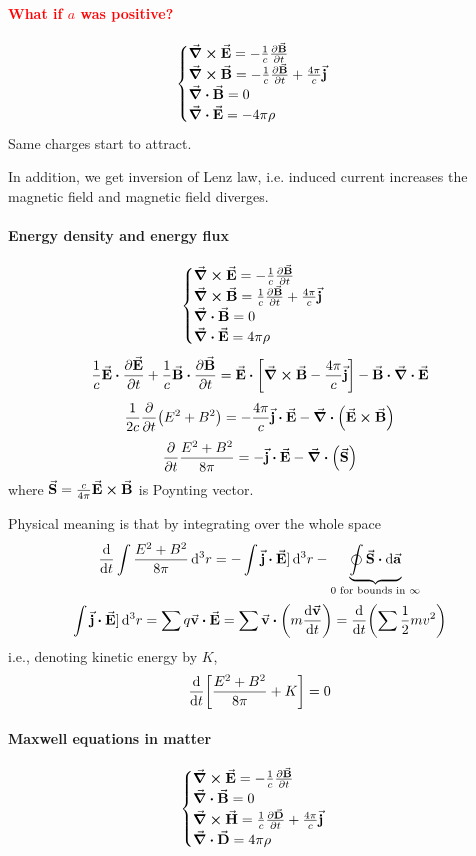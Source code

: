 \paragraph{\textcolor{red}{What if $a$ was positive?}}

$$\begin{cases}
\curl{\va{E}} = - \frac{1}{c} \pdv{\va{B}}{t}\\
\curl{\va{B}} =  -\frac{1}{c} \pdv{\va{B}}{t} + \frac{4\pi}{c} \va{j}\\
\div{\va{B}}=0\\
\div{\va{E}} = -4\pi \rho
\end{cases}$$
Same charges start to attract.

In addition, we get inversion of Lenz law, i.e. induced current increases the magnetic field and magnetic field diverges.
\paragraph{Energy density and energy flux}
$$\begin{cases}
\curl{\va{E}} = - \frac{1}{c} \pdv{\va{B}}{t}\\
\curl{\va{B}} =  \frac{1}{c} \pdv{\va{B}}{t} + \frac{4\pi}{c} \va{j}\\
\div{\va{B}}=0\\
\div{\va{E}} = 4\pi \rho
\end{cases}$$
$$\frac{1}{c} \va{E} \vdot \pdv{\va{E}}{t} + \frac{1}{c} \va{B}\vdot \pdv{\va{B}}{t} = \va{E} \vdot \qty[\curl{\va{B}} - \frac{4\pi}{c} \va{j}] - \va{B} \vdot \div{\va{E}} $$
$$\frac{1}{2c} \pdv{t} \qty( E^2+B^2) = - \frac{4\pi}{c} \va{j} \vdot \va{E}  - \div(\va{E} \cross \va{B})$$
$$ \pdv{t} \frac{E^2+B^2}{8\pi} = - \va{j} \vdot \va{E}  - \div(\va{S})$$
where $\va{S} = \frac{c}{4\pi} \va{E} \cross \va{B}$ is Poynting vector.

Physical meaning is that by integrating over the whole space
$$\dv{t} \int \frac{E^2+B^2}{8\pi} \dd[3]{r}= - \int \va{j} \vdot \va{E}] \dd[3]{r} - \underbrace{\oint \va{S} \vdot \dd{\va{a}}}_{0 \text{ for bounds in } \infty}$$
$$ \int \va{j} \vdot \va{E}] \dd[3]{r} = \sum q \va{v} \vdot \va{E} = \sum \va{v} \vdot \qty(m \dv{\va{v}}{t}) = \dv{t} (\sum \frac{1}{2} m v^2)$$
i.e., denoting kinetic energy by $K$,
$$\dv{t} \qty[\frac{E^2+B^2}{8\pi}  + K] = 0$$

\paragraph{Maxwell equations in matter}
$$\begin{cases}
\curl{\va{E}} = - \frac{1}{c} \pdv{\va{B}}{t}\\
\div{\va{B}}=0\\
\curl{\va{H}} =  \frac{1}{c} \pdv{\va{D}}{t} + \frac{4\pi}{c} \va{j}\\
\div{\va{D}} = 4\pi \rho
\end{cases}$$

